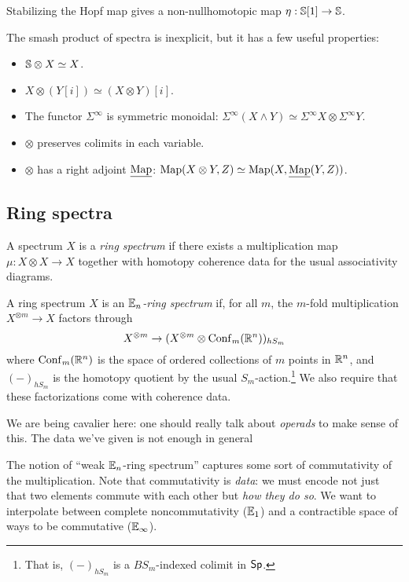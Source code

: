 \documentclass{article}
\begin{document}
\begin{ex}
	Stabilizing the Hopf map gives a non-nullhomotopic map $\eta: \mathbb{S}[1] \to \mathbb{S}$.
\end{ex}

The smash product of spectra is inexplicit, but it has a few useful properties:
\begin{itemize}
	\item $\mathbb{S} \otimes X \simeq X$.
	\item $X \otimes (Y[i]) \simeq (X \otimes Y)[i]$.
	\item The functor $\Sigma^\infty$ is symmetric monoidal: $\Sigma^\infty(X \wedge Y) \simeq \Sigma^\infty X \otimes \Sigma^\infty Y$.
	\item $\otimes$ preserves colimits in each variable.
	\item $\otimes$ has a right adjoint $\underline{\operatorname{Map}}$: $\operatorname{Map}(X \otimes Y, Z) \simeq \operatorname{Map}(X, \underline{\operatorname{Map}}(Y, Z))$.
\end{itemize}

\subsection{Ring spectra}

\begin{dfn}
	A spectrum $X$ is a \emph{ring spectrum} if there exists a multiplication map $\mu: X \otimes X \to X$ together with homotopy coherence data for the usual associativity diagrams.
\end{dfn}

\begin{dfn}
	A ring spectrum $X$ is an \emph{$\mathbb{E}_n$-ring spectrum} if, for all $m$, the $m$-fold multiplication $X^{\otimes m} \to X$ factors through
	\[
		X^{\otimes m} \to (X^{\otimes m} \otimes \operatorname{Conf}_m(\mathbb{R}^n))_{hS_m}
	\]
	where $\operatorname{Conf}_m(\mathbb{R}^n)$ is the space of ordered collections of $m$ points in $\mathbb{R}^n$, and $(-)_{hS_m}$ is the homotopy quotient by the usual $S_m$-action.\footnote{That is, $(-)_{hS_m}$ is a $BS_m$-indexed colimit in $\mathsf{Sp}$.}
	We also require that these factorizations come with coherence data.
\end{dfn}

\begin{rmk}
	We are being cavalier here: one should really talk about \emph{operads} to make sense of this.
	The data we've given is not enough in general
\end{rmk}

The notion of ``weak $\mathbb{E}_n$-ring spectrum'' captures some sort of commutativity of the multiplication.
Note that commutativity is \emph{data}: we must encode not just that two elements commute with each other but \emph{how they do so}.
We want to interpolate between complete noncommutativity ($\mathbb{E}_1$) and a contractible space of ways to be commutative ($\mathbb{E}_\infty$).
\end{document}
